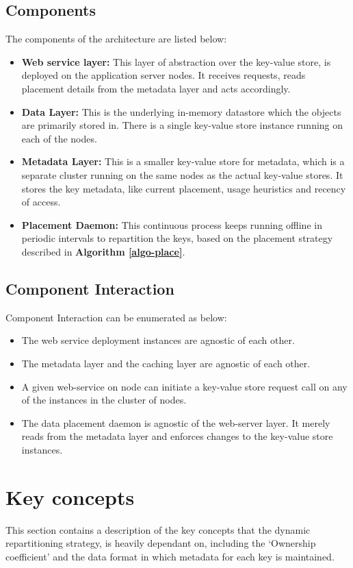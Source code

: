 \documentclass{sig-alternate}
\begin{document}
\subsection{Components}
The components of the architecture are listed below:
\begin{itemize}
	\item \textbf{Web service layer:} This layer of abstraction over the key-value store, is deployed on the application server nodes. It receives requests, reads placement details from the metadata layer and acts accordingly. 
	\item \textbf{Data Layer:} This is the underlying in-memory datastore which the objects are primarily stored in. There is a single key-value store instance running on each of the nodes.
	\item \textbf{Metadata Layer:} This is a smaller key-value store for metadata, which is a separate cluster running on the same nodes as the actual key-value stores. It stores the key metadata, like current placement, usage heuristics and recency of access.
	\item \textbf{Placement Daemon:} This continuous process keeps running offline in periodic intervals to repartition the keys, based on the placement strategy described in \textbf{Algorithm \ref{algo-place}}.
\end{itemize}

\subsection{Component Interaction}
Component Interaction can be enumerated as below:
\begin{itemize}
	\item The web service deployment instances are agnostic of each other.
	\item The metadata layer and the caching layer are agnostic of each other.
	\item A given web-service on node can initiate a key-value store request call on any of the instances in the cluster of nodes.
	\item The data placement daemon is agnostic of the web-server layer. It merely reads from the metadata layer and enforces changes to the key-value store instances.
\end{itemize}


\section{Key concepts}
This section contains a description of the key concepts that the dynamic repartitioning strategy, is heavily dependant on, including the `Ownership coefficient' and the data format in which metadata for each key is maintained.\\
\end{document}
